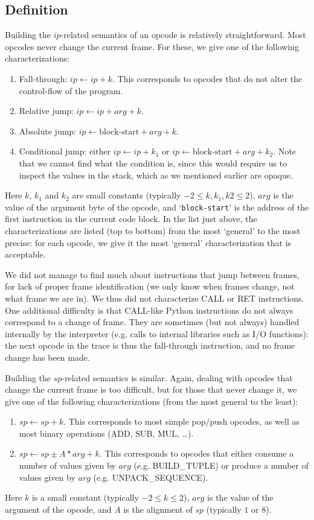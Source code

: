 \documentclass[english]{article}
\begin{document}
\subsection{Definition}

Building the $ip$-related semantics of an opcode is relatively straightforward. Most opcodes never change the current frame. For these, we give one of the following characterizations:
\begin{enumerate}
	\item Fall-through: $ip \leftarrow ip + k$. This corresponds to opcodes that do not alter the control-flow of the program.
	\item Relative jump: $ip \leftarrow ip + arg + k$.
	\item Absolute jump: $ip \leftarrow \textrm{block-start} + arg + k$.
	\item Conditional jump: $\textrm{either } ip \leftarrow ip + k_1 \textrm{ or } ip \leftarrow \textrm{block-start} + arg + k_2$. Note that we cannot find what the condition is, since this would require us to inspect the values in the stack, which as we mentioned earlier are opaque.
\end{enumerate}
Here $k$, $k_1$ and $k_2$ are small constants (typically $-2 \leq k, k_1, k2 \leq 2$), $arg$ is the value of the argument byte of the opcode, and `\texttt{block-start}' is the address of the first instruction in the current code block. 	
In the list just above, the characterizations are listed (top to bottom) from the most `general' to the most precise: for each opcode, we give it the most `general' characterization that is acceptable.

We did not manage to find much about instructions that jump between frames, for lack of proper frame identification (we only know when frames change, not what frame we are in). We thus did not characterize CALL or RET instructions. One additional difficulty is that CALL-like Python instructions do not always correspond to a change of frame. They are sometimes (but not always) handled internally by the interpreter (e.g. calls to internal libraries such as I/O functions): the next opcode in the trace is thus the fall-through instruction, and no frame change has been made.

Building the $sp$-related semantics is similar. Again, dealing with opcodes that change the current frame is too difficult, but for those that never change it, we give one of the following characterizations (from the most general to the least):
\begin{enumerate}
	\item $sp \leftarrow sp + k$. This corresponds to most simple pop/push opcodes, as well as most binary operations (ADD, SUB, MUL, \dots).
	\item $sp \leftarrow sp \pm A*arg + k$. This corresponds to opcodes that either consume a number of values given by $arg$ (e.g. BUILD\_TUPLE) or produce a number of values given by $arg$ (e.g. UNPACK\_SEQUENCE).
\end{enumerate}
Here $k$ is a small constant (typically $-2 \leq k \leq 2$), $arg$ is the value of the argument of the opcode, and $A$ is the alignment of $sp$ (typically $1$ or $8$).
\end{document}

